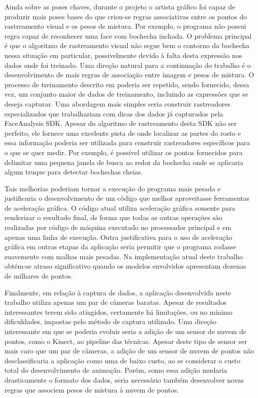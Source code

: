 Ainda sobre as poses chaves, durante o projeto o artista gráfico foi capaz de
produzir mais poses bases do que criou-se regras associativas entre os pontos do
rastreamento visual e os pesos de mistura. Por exemplo, o programa não possui
regra capaz de reconhecer uma face com bochecha inchada. O problema principal é
que o algoritmo de rastreamento visual não segue bem o contorno da bochecha
nessa situação em particular, possivelmente devido à falta desta expressão nos
dados onde foi treinado. Uma direção natural para a continuação do trabalho é o
desenvolvimento de mais regras de associação entre imagem e pesos de mistura. O
processo de treinamento descrito em \cite{facetracker} poderia ser repetido,
sendo fornecido, dessa vez, um conjunto maior de dados de treinamento, incluindo
as expressões que se deseja capturar. Uma abordagem mais simples seria construir
rastreadores especializados que trabalhariam com dicas dos dados já capturados
pela FaceAnalysis SDK. Apesar do algoritmo de rastreamento desta SDK não ser
perfeito, ele fornece uma excelente pista de onde localizar as partes do rosto e
essa informação poderia ser utilizada para construir rastreadores específicos
para o que se quer medir. Por exemplo, é possível utilizar os pontos fornecidos
para delimitar uma pequena janela de busca ao redor da bochecha onde se
aplicaria algum truque para detectar bochechas cheias.

Tais melhorias poderiam tornar a execução do programa mais pesada e justificaria
o desenvolvimento de um código que melhor aproveitasse ferramentas de aceleração
gráfica. O código atual utiliza aceleração gráfica somente para renderizar o
resultado final, de forma que todas as outras operações são realizadas por
código  de máquina executado no processador principal  e em apenas uma linha de
execução. Outra justificativa para o uso de aceleração gráfica em outras etapas
da aplicação seria permitir que o programa rodasse suavemente com malhas mais
pesadas. Na implementação atual deste trabalho obtém-se atraso significativo
quando os modelos envolvidos apresentam dezenas de milhares de pontos.

Finalmente, em relação à captura de dados, a aplicação desenvolvida neste
trabalho utiliza apenas um par de câmeras baratas. Apesar de resultados
interessantes terem sido atingidos, certamente há limitações, ou no mínimo
dificuldades, impostas pelo método de captura utilizado.  Uma direção
interessante em que se poderia evoluir seria a adição de um sensor de nuvem de
pontos, como o Kinect, ao pipeline das técnicas. Apesar deste tipo de sensor ser
mais caro que um par de câmeras, a adição de um sensor de nuvem de pontos não
desclassificaria a aplicação como uma de baixo custo, ao se considerar o custo
total do desenvolvimento de animação. Porém, como essa adição mudaria
drasticamente o formato dos dados, seria necessário também desenvolver novas
regras que associem pesos de mistura à nuvem de pontos.

